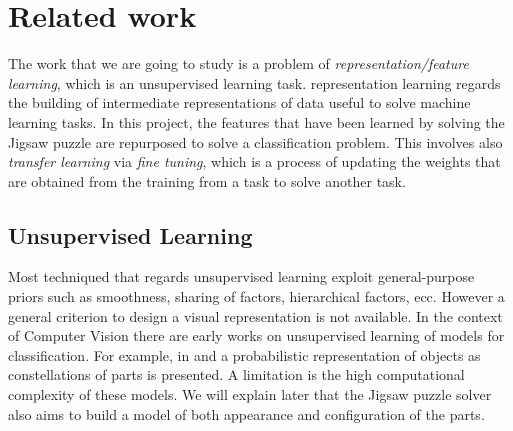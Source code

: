 \section{Related work}
The work that we are going to study is a problem of \emph{representation/feature learning}, which is an unsupervised learning task. representation learning regards the building of intermediate representations of data useful to solve machine learning tasks. In this project, the features that have been learned by solving the Jigsaw puzzle are repurposed to solve a classification problem. This involves also \emph{transfer learning} via \emph{fine tuning}, which is a process of updating the weights that are obtained from the training from a task to solve another task.

\subsection{Unsupervised Learning}
Most techniqued that regards unsupervised learning exploit general-purpose priors such as smoothness, sharing of factors, hierarchical factors, ecc. However a general criterion to design a visual representation is not available. In the context of Computer Vision there are early works on unsupervised learning of models for classification. For example, in \cite{unsupervised_scale_invariant_learning} and \cite{unsupervised_learning_model_recognition} a probabilistic representation of objects as constellations of parts is presented. A limitation is the high computational complexity of these models. We will explain later that the Jigsaw puzzle solver also aims to build a model of both appearance and configuration of the parts.

